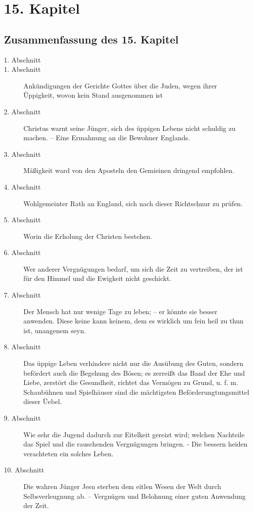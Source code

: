 
\chapter{15. Kapitel}

\section{Zusammenfassung des 15. Kapitel}
\small
\begin{description}
\item[1. Abschnitt]
\item[1. Abschnitt] Ankündigungen der Gerichte Gottes über die Juden, wegen ihrer Üppigkeit, wovon kein Stand ausgenommen ist
\item[2. Abschnitt] Christus warnt seine Jünger, sich des üppigen Lebens nicht schuldig zu machen. -- Eine Ermahnung an die Bewohner Englands.
\item[3. Abschnitt] Mäßigkeit ward von den Aposteln den Gemieinen dringend empfohlen.
\item[4. Abschnitt] Wohlgemeinter Rath an England, sich nach dieser Richtschnur zu prüfen.
\item[5. Abschnitt] Worin die Erholung der Christen bestehen.
\item[6. Abschnitt] Wer anderer Vergnügungen bedarf, um sich die Zeit zu vertreiben, der ist für den Himmel und die Ewigkeit nicht geschickt.
\item[7. Abschnitt] Der Mensch hat nur wenige Tage zu leben; -- er könnte sie besser anwenden. Diese keine kann keinem, dem es wirklich um fein heil zu thun ist, unangenem seyn.
\item[8. Abschnitt] Das üppige Leben verhindere nicht nur die Ausübung des Guten, sondern befördert auch die Begehung des Bösen; es zerreißt das Band der Ehe und Liebe, zerstört die Gesundheit, richtet das Vermögen zu Grund, u. f. m. Schaubühnen und Spielhäuser sind die mächtigsten Beförderungtungsmittel dieser Üebel.
\item[9. Abschnitt] Wie sehr die Jugend dadurch zur Eitelkeit gereizt wird; welchen Nachteile das Spiel und die rauschenden Vergnügungen bringen. - Die bessern heiden verachteten ein solches Leben.
\item[10. Abschnitt] Die wahren Jünger Jesu sterben dem eitlen Wesen der Welt durch Selbsverleugnung ab. -- Vergnügen und Belohnung einer guten Anwendung der Zeit.

\end{description}
\normalsize

